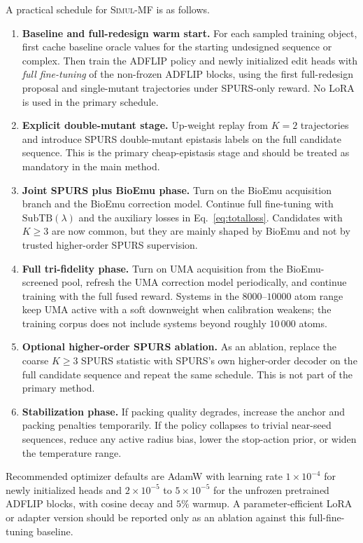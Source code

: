 \documentclass[11pt]{article}
\newcommand{\SubTB}{\ensuremath{\mathrm{SubTB}}}
\newcommand{\methodI}{\textsc{Simul-MF}}
\begin{document}
A practical schedule for \methodI{} is as follows.
\begin{enumerate}[leftmargin=1.5em]
    \item \textbf{Baseline and full-redesign warm start.} For each sampled training object, first cache baseline oracle values for the starting undesigned sequence or complex. Then train the ADFLIP policy and newly initialized edit heads with \emph{full fine-tuning} of the non-frozen ADFLIP blocks, using the first full-redesign proposal and single-mutant trajectories under SPURS-only reward. No LoRA is used in the primary schedule.
    \item \textbf{Explicit double-mutant stage.} Up-weight replay from $K=2$ trajectories and introduce SPURS double-mutant epistasis labels on the full candidate sequence. This is the primary cheap-epistasis stage and should be treated as mandatory in the main method.
    \item \textbf{Joint SPURS plus BioEmu phase.} Turn on the BioEmu acquisition branch and the BioEmu correction model. Continue full fine-tuning with \SubTB$(\lambda)$ and the auxiliary losses in Eq.~\eqref{eq:totalloss}. Candidates with $K\ge 3$ are now common, but they are mainly shaped by BioEmu and not by trusted higher-order SPURS supervision.
    \item \textbf{Full tri-fidelity phase.} Turn on UMA acquisition from the BioEmu-screened pool, refresh the UMA correction model periodically, and continue training with the full fused reward. Systems in the $8000$--$10000$ atom range keep UMA active with a soft downweight when calibration weakens; the training corpus does not include systems beyond roughly $10\,000$ atoms.
    \item \textbf{Optional higher-order SPURS ablation.} As an ablation, replace the coarse $K\ge 3$ SPURS statistic with SPURS's own higher-order decoder on the full candidate sequence and repeat the same schedule. This is not part of the primary method.
    \item \textbf{Stabilization phase.} If packing quality degrades, increase the anchor and packing penalties temporarily. If the policy collapses to trivial near-seed sequences, reduce any active radius bias, lower the stop-action prior, or widen the temperature range.
\end{enumerate}
Recommended optimizer defaults are AdamW with learning rate $1\times 10^{-4}$ for newly initialized heads and $2\times 10^{-5}$ to $5\times 10^{-5}$ for the unfrozen pretrained ADFLIP blocks, with cosine decay and $5\%$ warmup. A parameter-efficient LoRA or adapter version should be reported only as an ablation against this full-fine-tuning baseline.
\end{document}
